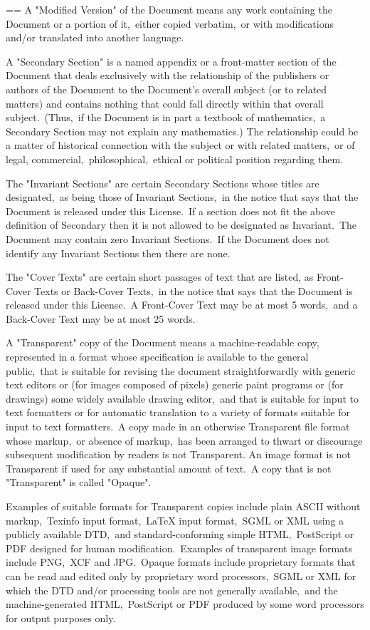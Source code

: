 \documentclass{book}
\makeatletter
\newenvironment{Texinfopreformatted}{%
  \par\GNUTobeylines\obeyspaces\frenchspacing\parskip=\z@\parindent=\z@}{}
{\catcode`\^^M=13 \gdef\GNUTobeylines{\catcode`\^^M=13 \def^^M{\null\par}}}
\newenvironment{Texinfoindented}{\begin{list}{}{}\item\relax}{\end{list}}
\renewcommand{\_}{\Texinfounderscore\discretionary{}{}{}}
\makeatother
\begin{document}
\begin{Texinfoindented}
\begin{Texinfopreformatted}
A "Modified Version" of the Document means any work containing the
Document or a portion of it,\ either copied verbatim,\ or with
modifications and/or translated into another language.

A "Secondary Section" is a named appendix or a front-matter section of
the Document that deals exclusively with the relationship of the
publishers or authors of the Document to the Document's overall
subject (or to related matters) and contains nothing that could fall
directly within that overall subject.\  (Thus,\ if the Document is in
part a textbook of mathematics,\ a Secondary Section may not explain
any mathematics.)  The relationship could be a matter of historical
connection with the subject or with related matters,\ or of legal,
commercial,\ philosophical,\ ethical or political position regarding
them.

The "Invariant Sections" are certain Secondary Sections whose titles
are designated,\ as being those of Invariant Sections,\ in the notice
that says that the Document is released under this License.\  If a
section does not fit the above definition of Secondary then it is not
allowed to be designated as Invariant.\  The Document may contain zero
Invariant Sections.\  If the Document does not identify any Invariant
Sections then there are none.

The "Cover Texts" are certain short passages of text that are listed,
as Front-Cover Texts or Back-Cover Texts,\ in the notice that says that
the Document is released under this License.\  A Front-Cover Text may
be at most 5 words,\ and a Back-Cover Text may be at most 25 words.

A "Transparent" copy of the Document means a machine-readable copy,
represented in a format whose specification is available to the
general public,\ that is suitable for revising the document
straightforwardly with generic text editors or (for images composed of
pixels) generic paint programs or (for drawings) some widely available
drawing editor,\ and that is suitable for input to text formatters or
for automatic translation to a variety of formats suitable for input
to text formatters.\  A copy made in an otherwise Transparent file
format whose markup,\ or absence of markup,\ has been arranged to thwart
or discourage subsequent modification by readers is not Transparent.
An image format is not Transparent if used for any substantial amount
of text.\  A copy that is not "Transparent" is called "Opaque".

Examples of suitable formats for Transparent copies include plain
ASCII without markup,\ Texinfo input format,\ LaTeX input format,\ SGML
or XML using a publicly available DTD,\ and standard-conforming simple
HTML,\ PostScript or PDF designed for human modification.\  Examples of
transparent image formats include PNG,\ XCF and JPG.\  Opaque formats
include proprietary formats that can be read and edited only by
proprietary word processors,\ SGML or XML for which the DTD and/or
processing tools are not generally available,\ and the
machine-generated HTML,\ PostScript or PDF produced by some word
processors for output purposes only.


\end{Texinfopreformatted}
\end{Texinfoindented}
\end{document}
